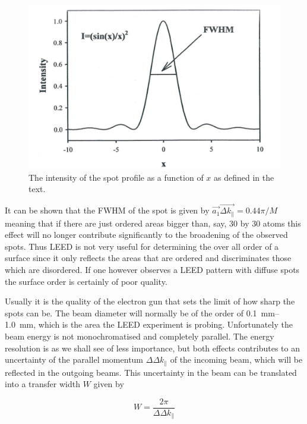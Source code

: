 \begin{figure}[h!]
	\begin{center}
	\includegraphics[scale=3]{figures/09_10.png}
	\caption{The intensity of the spot profile as a function of $x$ as defined in the text.}
	\label{fig:spotprofileint}
	\end{center}
\end{figure}

It can be shown that the FWHM of the spot is given by $\vec{a_1}\vec{\Delta k_{\parallel}}=0.44\pi /M$ meaning that if there are just ordered areas bigger than, say, 30 by 30 atoms this effect will no longer contribute significantly  to the  broadening of the observed spots. Thus LEED is not very useful for determining the over all order of a surface since it only reflects the areas that are ordered and discriminates those which are disordered. If one however observes a LEED pattern with diffuse spots the surface order is certainly of poor quality.

Usually it is the quality of the electron gun that sets the limit of how sharp the spots can be. The beam diameter will normally be of the order of \SIrange{0.1}{1.0}{mm}, which is the area the LEED experiment is probing. Unfortunately the beam energy is not monochromatised and completely parallel. The energy resolution is as we shall see of less importance, but both effects contributes to an uncertainty of the parallel momentum $\Delta \Delta k_{\parallel}$  of the incoming beam, which will be reflected in the outgoing beams. This uncertainty in the beam can be translated into a transfer width $W$ given by

\begin{equation}
W=\frac{2\pi}{\Delta \Delta k_{\parallel}}
\end{equation}
 
